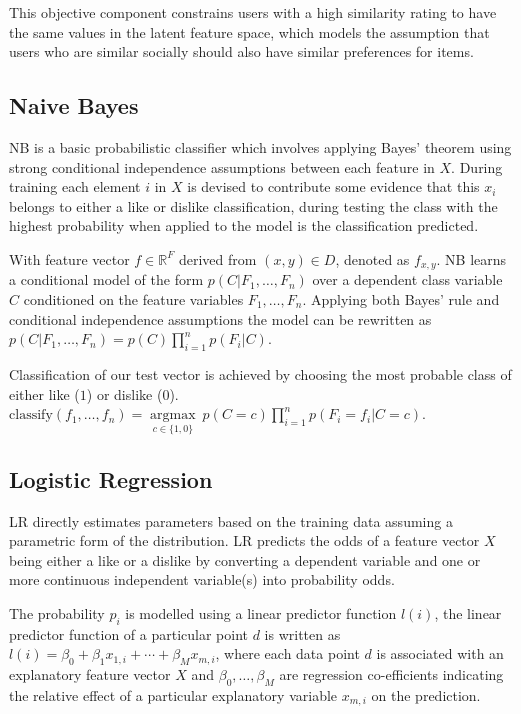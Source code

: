 This objective component constrains users with a high similarity rating to have the same values in the latent feature space, which
models the assumption that users who are similar socially should also have similar preferences for items.

\subsection{Naive Bayes}
\label{sec:nb}

NB is a basic probabilistic classifier which involves applying Bayes' theorem using strong conditional independence 
assumptions between each feature in $X$. During training each element $i$ in $X$ is devised to contribute some 
evidence that this $x_i$ belongs to either a like or dislike classification, during testing the class with the highest probability 
when applied to the model is the classification predicted. 

With feature vector $f \in \mathbb{R}^F$ derived from $(x,y) \in D$, denoted as $f_{x,y}$. NB learns a conditional model of the form 
$p(C|F_1, \dots, F_n)$ over a dependent class variable $C$ conditioned on the feature variables $F_1, \dots, F_n$. Applying both Bayes' rule 
and conditional independence assumptions the model can be rewritten as $p(C|F_1, \dots, F_n) = p(C) \displaystyle\prod_{i=1}^n p(F_i|C)$.

Classification of our test vector is achieved by choosing the most probable class of either like ($1$) or dislike ($0$).
\\
$\mathrm{classify}(f_1,\dots,f_n) = \underset{c \in \{1,0\}}{\operatorname{argmax}} \ p(C=c) \displaystyle\prod_{i=1}^n p(F_i=f_i\vert C=c)$.

\subsection{Logistic Regression}
\label{sec:lr}

LR directly estimates parameters based on the training data assuming a parametric form of the distribution.
LR predicts the odds of a feature vector $X$ being either a like or a dislike by converting a dependent variable and 
one or more continuous independent variable(s) into probability odds.

The probability $p_i$ is modelled using a linear predictor function $l(i)$, the linear predictor function of a particular point $d$ 
is written as $l(i) = \beta_0 + \beta_1 x_{1,i} + \cdots + \beta_M x_{m,i}$, where each data point $d$ is associated with an explanatory 
feature vector $X$ and $\beta_0, \ldots, \beta_M$ are regression co-efficients indicating the relative effect of a particular 
explanatory variable $x_{m,i}$ on the prediction.

